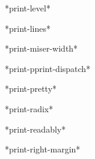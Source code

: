 \begin{variable}{*print-level*}{}{}{}
  
\end{variable}

\begin{variable}{*print-lines*}{}{}{}
  
\end{variable}

\begin{variable}{*print-miser-width*}{}{}{}
  
\end{variable}

\begin{variable}{*print-pprint-dispatch*}{}{}{}
  
\end{variable}

\begin{variable}{*print-pretty*}{}{}{}
  
\end{variable}

\begin{variable}{*print-radix*}{}{}{}
  
\end{variable}

\begin{variable}{*print-readably*}{}{}{}
  
\end{variable}

\begin{variable}{*print-right-margin*}{}{}{}
  
\end{variable}
